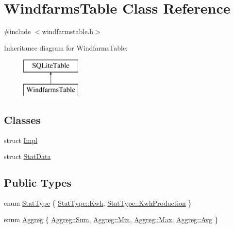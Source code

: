 \hypertarget{class_windfarms_table}{}\section{Windfarms\+Table Class Reference}
\label{class_windfarms_table}


{\ttfamily \#include $<$windfarmstable.\+h$>$}

Inheritance diagram for Windfarms\+Table\+:\begin{figure}[H]
\begin{center}
\leavevmode
\includegraphics[height=2.000000cm]{d4/dba/class_windfarms_table}
\end{center}
\end{figure}
\subsection*{Classes}
\begin{DoxyCompactItemize}
\item 
struct \mbox{\hyperlink{struct_windfarms_table_1_1_impl}{Impl}}
\item 
struct \mbox{\hyperlink{struct_windfarms_table_1_1_stat_data}{Stat\+Data}}
\end{DoxyCompactItemize}
\subsection*{Public Types}
\begin{DoxyCompactItemize}
\item 
enum \mbox{\hyperlink{class_windfarms_table_a882699395a936d2997b9482c08fe8515}{Stat\+Type}} \{ \mbox{\hyperlink{class_windfarms_table_a882699395a936d2997b9482c08fe8515ac88e6e874a8d09c7f8f4a41e3f526e5a}{Stat\+Type\+::\+Kwh}}, 
\mbox{\hyperlink{class_windfarms_table_a882699395a936d2997b9482c08fe8515a0c4a66b711533aa6c30ce60baa173978}{Stat\+Type\+::\+Kwh\+Production}}
 \}
\item 
enum \mbox{\hyperlink{class_windfarms_table_a59a8562d196d503dd3420e06a4613696}{Aggreg}} \{ \mbox{\hyperlink{class_windfarms_table_a59a8562d196d503dd3420e06a4613696aa0ec87054b5e5b7847d0d8780a01a3d5}{Aggreg\+::\+Sum}}, 
\mbox{\hyperlink{class_windfarms_table_a59a8562d196d503dd3420e06a4613696a78d811e98514cd165dda532286610fd2}{Aggreg\+::\+Min}}, 
\mbox{\hyperlink{class_windfarms_table_a59a8562d196d503dd3420e06a4613696a6a061313d22e51e0f25b7cd4dc065233}{Aggreg\+::\+Max}}, 
\mbox{\hyperlink{class_windfarms_table_a59a8562d196d503dd3420e06a4613696a5c0c148daa2c67922abe6018b87a759f}{Aggreg\+::\+Avg}}
 \}
\end{DoxyCompactItemize}
